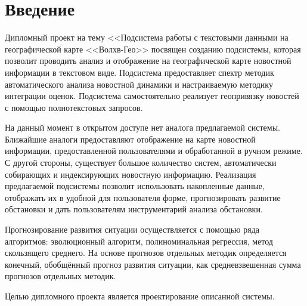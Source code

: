 \section*{Введение}

Дипломный проект на тему <<Подсистема работы с текстовыми данными на географической карте <<Волхв-Гео>> посвящен созданию подсистемы, которая позволит проводить анализ и отображение на географической карте новостной информации в текстовом виде. Подсистема предоставляет спектр методик автоматического анализа новостной динамики и настраиваемую методику интеграции оценок. Подсистема самостоятельно реализует геопривязку новостей с помощью полнотекстовых запросов.

На данный момент в открытом доступе нет аналога предлагаемой системы. Ближайшие аналоги предоставляют отображение на карте новостной информации, предоставленной пользователями и обработанной в ручном режиме. С другой стороны, существует большое количество систем, автоматически собирающих и индексирующих новостную информацию. Реализация предлагаемой подсистемы позволит использовать накопленные данные, отображать их в удобной для пользователя форме, прогнозировать развитие обстановки и дать пользователям инструментарий анализа обстановки.

Прогнозирование развития ситуации осуществляется с помощью ряда алгоритмов: эволюционный алгоритм, полиноминальная регрессия, метод скользящего среднего. На основе прогнозов отдельных методик определяется конечный, обобщённый прогноз развития ситуации, как средневзвешенная сумма прогнозов отдельных методик.

Целью дипломного проекта является проектирование описанной системы.